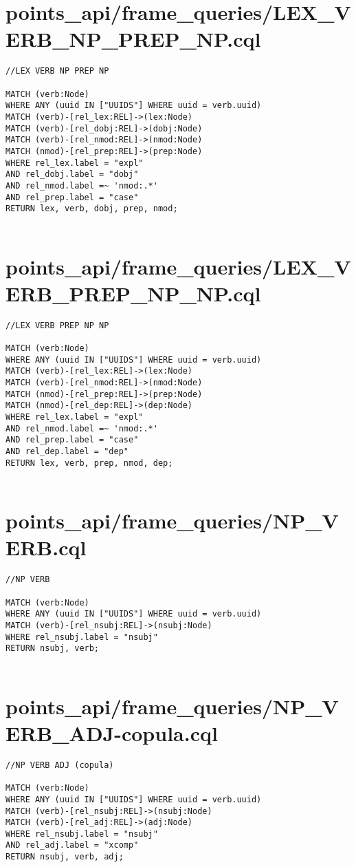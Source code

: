 \documentclass{article}
\begin{document}
\section*{points\_api/frame\_queries/LEX\_VERB\_NP\_PREP\_NP.cql}
\begin{verbatim}
//LEX VERB NP PREP NP

MATCH (verb:Node)
WHERE ANY (uuid IN ["UUIDS"] WHERE uuid = verb.uuid)
MATCH (verb)-[rel_lex:REL]->(lex:Node)
MATCH (verb)-[rel_dobj:REL]->(dobj:Node)
MATCH (verb)-[rel_nmod:REL]->(nmod:Node)
MATCH (nmod)-[rel_prep:REL]->(prep:Node)
WHERE rel_lex.label = "expl"
AND rel_dobj.label = "dobj"
AND rel_nmod.label =~ 'nmod:.*'
AND rel_prep.label = "case"
RETURN lex, verb, dobj, prep, nmod;


\end{verbatim}
\pagebreak

\section*{points\_api/frame\_queries/LEX\_VERB\_PREP\_NP\_NP.cql}
\begin{verbatim}
//LEX VERB PREP NP NP

MATCH (verb:Node)
WHERE ANY (uuid IN ["UUIDS"] WHERE uuid = verb.uuid)
MATCH (verb)-[rel_lex:REL]->(lex:Node)
MATCH (verb)-[rel_nmod:REL]->(nmod:Node)
MATCH (nmod)-[rel_prep:REL]->(prep:Node)
MATCH (nmod)-[rel_dep:REL]->(dep:Node)
WHERE rel_lex.label = "expl"
AND rel_nmod.label =~ 'nmod:.*'
AND rel_prep.label = "case"
AND rel_dep.label = "dep"
RETURN lex, verb, prep, nmod, dep;


\end{verbatim}
\pagebreak

\section*{points\_api/frame\_queries/NP\_VERB.cql}
\begin{verbatim}
//NP VERB

MATCH (verb:Node)
WHERE ANY (uuid IN ["UUIDS"] WHERE uuid = verb.uuid)
MATCH (verb)-[rel_nsubj:REL]->(nsubj:Node)
WHERE rel_nsubj.label = "nsubj"
RETURN nsubj, verb;


\end{verbatim}
\pagebreak

\section*{points\_api/frame\_queries/NP\_VERB\_ADJ-copula.cql}
\begin{verbatim}
//NP VERB ADJ (copula)

MATCH (verb:Node)
WHERE ANY (uuid IN ["UUIDS"] WHERE uuid = verb.uuid)
MATCH (verb)-[rel_nsubj:REL]->(nsubj:Node)
MATCH (verb)-[rel_adj:REL]->(adj:Node)
WHERE rel_nsubj.label = "nsubj"
AND rel_adj.label = "xcomp"
RETURN nsubj, verb, adj;


\end{verbatim}
\pagebreak
\end{document}
